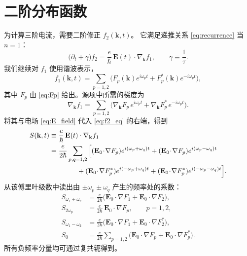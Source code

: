\section{二阶分布函数}
\label{sec:f2}

为计算三阶电流，需要二阶修正 \(f_2(\mathbf{k},t)\)。
它满足递推关系 \eqref{eq:recurrence} 当 \(n=1\)：
\begin{equation}
\big(\partial_t + \gamma\big) f_2 = \frac{e}{\hbar}\,\mathbf{E}(t)\cdot\nabla_{\mathbf{k}} f_1,
\qquad \gamma \equiv \frac1\tau.
\label{eq:f2_eq}
\end{equation}
我们继续对 \(f_1\) 使用谐波表示，
\[
f_1(\mathbf{k},t) = \sum_{p=1,2} \big( F_p(\mathbf{k}) e^{i\omega_p t} + F_p^*(\mathbf{k}) e^{-i\omega_p t} \big),
\]
其中 \(F_p\) 由 \eqref{eq:Fp} 给出。源项中所需的梯度为
\[
\nabla_{\mathbf{k}} f_1 = \sum_{p=1,2} \big( \nabla_{\mathbf{k}} F_p\, e^{i\omega_p t} + \nabla_{\mathbf{k}} F_p^*\, e^{-i\omega_p t} \big).
\]
将其与电场 \eqref{eq:E_field} 代入 \eqref{eq:f2_eq} 的右端，得到
\begin{align}
S(\mathbf{k},t) &\equiv \frac{e}{\hbar}\,\mathbf{E}(t)\cdot\nabla_{\mathbf{k}} f_1 \notag\\
&= \frac{e}{2\hbar}\sum_{p,q=1,2}\Big[
      (\mathbf{E}_0\!\cdot\!\nabla F_p) e^{i(\omega_p+\omega_q)t}
      + (\mathbf{E}_0\!\cdot\!\nabla F_p) e^{i(\omega_p-\omega_q)t}
      \notag\\
      &\qquad\qquad
      + (\mathbf{E}_0\!\cdot\!\nabla F_p^*) e^{i(-\omega_p+\omega_q)t}
      + (\mathbf{E}_0\!\cdot\!\nabla F_p^*) e^{i(-\omega_p-\omega_q)t}
      \Big].
\label{eq:S_full}
\end{align}
从该傅里叶级数中读出由 \(\pm\omega_p\pm\omega_q\) 产生的频率处的系数：
\begin{align}
S_{\omega_1+\omega_2} &= \frac{e}{2\hbar}\big(\mathbf{E}_0\!\cdot\!\nabla F_1 + \mathbf{E}_0\!\cdot\!\nabla F_2\big), \label{eq:S_sum}\\
S_{2\omega_p} &= \frac{e}{2\hbar}\,\mathbf{E}_0\!\cdot\!\nabla F_p, \qquad p=1,2, \label{eq:S_2w}\\
S_{\omega_1-\omega_2} &= \frac{e}{2\hbar}\big(\mathbf{E}_0\!\cdot\!\nabla F_1 + \mathbf{E}_0\!\cdot\!\nabla F_2^*\big), \label{eq:S_diff}\\
S_0 &= \frac{e}{2\hbar}\sum_{p=1,2}\big(\mathbf{E}_0\!\cdot\!\nabla F_p + \mathbf{E}_0\!\cdot\!\nabla F_p^*\big). \label{eq:S_0}
\end{align}
所有负频率分量均可通过复共轭得到。

